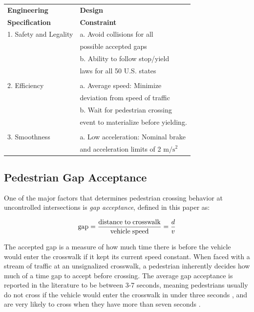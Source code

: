 \documentclass[letterpaper, 10 pt, conference]{ieeeconf} %
\begin{document}
\begin{center}
\begin{tabular}{ l| l }
\label{tb:specs}
 \textbf{Engineering} & \textbf{Design} \\
 \textbf{Specification\cite{Thornton2018}} & \textbf{Constraint}\\\hline 
 1. Safety and Legality & a. Avoid collisions for all\\
           & possible accepted gaps            \\
           &b. Ability to follow stop/yield  \\
           &laws for all 50 U.S. states\\
           
&\\
 2. Efficiency & a. Average speed: Minimize \\ 
        & deviation from speed of traffic \\  
        & b. Wait for pedestrian crossing \\
        & event to materialize before yielding. \\ 

        & \\
 3. Smoothness & a. Low acceleration: Nominal brake \\ 
 			  & and acceleration limits of 2 $\mathrm{m/s^2}$ \\


\end{tabular}
\end{center}

\subsection{Pedestrian Gap Acceptance}

One of the major factors that determines pedestrian crossing behavior at uncontrolled intersections is \textit{gap acceptance}, defined in this paper as:

\begin{equation}
\mathrm{gap} = \frac{\mathrm{distance\hspace{1mm}to\hspace{1mm}crosswalk}}{\mathrm{vehicle\hspace{1mm}speed}} = \frac{d}{v}
\end{equation} 

The accepted gap is a measure of how much time there is before the vehicle would enter the crosswalk if it kept its current speed constant. When faced with a stream of traffic at an unsignalized crosswalk, a pedestrian inherently decides how much of a time gap to accept before crossing. The average gap acceptance is reported in the literature to be between 3-7 seconds, meaning pedestrians usually do not cross if the vehicle would enter the crosswalk in under three seconds \cite{DiPietroCharlesMandKing1970}, and are very likely to cross when they have more than seven seconds \cite{Schmidt2009}. 
\end{document}
